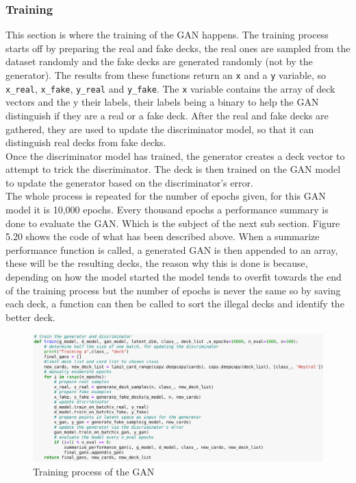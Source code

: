 \documentclass{report} %
\begin{document}
\subsubsection{Training}
This section is where the training of the GAN happens. The training process starts off by preparing the real and fake decks, the real ones are sampled from the dataset randomly and the fake decks are generated randomly (not by the generator). The results from these functions return an \texttt{x} and a \texttt{y} variable, so \nolinkurl{x_real}, \nolinkurl{x_fake}, \nolinkurl{y_real} and \nolinkurl{y_fake}. The \texttt{x} variable contains the array of deck vectors and the y their labels, their labels being a binary to help the GAN distinguish if they are a real or a fake deck. After the real and fake decks are gathered, they are used to update the discriminator model, so that it can distinguish real decks from fake decks. \\
Once the discriminator model has trained, the generator creates a deck vector to attempt to trick the discriminator. The deck is then trained on the GAN model to update the generator based on the discriminator's error.  \\
The whole process is repeated for the number of epochs given, for this GAN model it is 10,000 epochs. Every thousand epochs a performance summary is done to evaluate the GAN. Which is the subject of the next sub section. Figure 5.20 shows the code of what has been described above. When a summarize performance function is called, a generated GAN is then appended to an array, these will be the resulting decks, the reason why this is done is because, depending on how the model started the model tends to overfit towards the end of the training process but the number of epochs is never the same so by saving each deck, a function can then be called to sort the illegal decks and identify the better deck.

\begin{figure}[H]
\centering
\includegraphics[width=1.25\textwidth]{train}
\caption{Training process of the GAN\protect}
 \label{board}
\end{figure}
\end{document}
